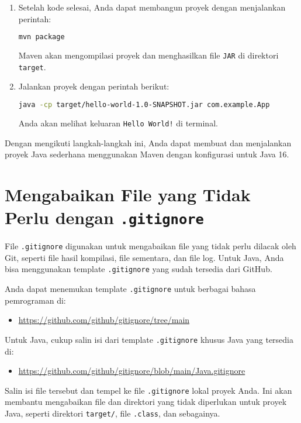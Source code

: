 \begin{enumerate}
	\item Setelah kode selesai, Anda dapat membangun proyek dengan menjalankan perintah:
	\begin{lstlisting}[language=bash]
		mvn package
	\end{lstlisting}
	Maven akan mengompilasi proyek dan menghasilkan file \texttt{JAR} di direktori \texttt{target}.
	
	\item Jalankan proyek dengan perintah berikut:
	\begin{lstlisting}[language=bash]
		java -cp target/hello-world-1.0-SNAPSHOT.jar com.example.App
	\end{lstlisting}
	Anda akan melihat keluaran \texttt{Hello World!} di terminal.
\end{enumerate}

Dengan mengikuti langkah-langkah ini, Anda dapat membuat dan menjalankan proyek Java sederhana menggunakan Maven dengan konfigurasi untuk Java 16.

\section{Mengabaikan File yang Tidak Perlu dengan \texttt{.gitignore}}

File \texttt{.gitignore} digunakan untuk mengabaikan file yang tidak perlu dilacak oleh Git, seperti file hasil kompilasi, file sementara, dan file log. Untuk Java, Anda bisa menggunakan template \texttt{.gitignore} yang sudah tersedia dari GitHub.

Anda dapat menemukan template \texttt{.gitignore} untuk berbagai bahasa pemrograman di:
\begin{itemize}
	\item \href{https://github.com/github/gitignore/tree/main}{https://github.com/github/gitignore/tree/main}
\end{itemize}

Untuk Java, cukup salin isi dari template \texttt{.gitignore} khusus Java yang tersedia di:
\begin{itemize}
	\item \href{https://github.com/github/gitignore/blob/main/Java.gitignore}{https://github.com/github/gitignore/blob/main/Java.gitignore}
\end{itemize}

Salin isi file tersebut dan tempel ke file \texttt{.gitignore} lokal proyek Anda. Ini akan membantu mengabaikan file dan direktori yang tidak diperlukan untuk proyek Java, seperti direktori \texttt{target/}, file \texttt{.class}, dan sebagainya.

